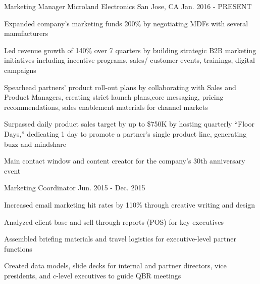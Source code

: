 

\begin{cventries}

  \cventry
    {Marketing Manager} %
    {Microland Electronics} %
    {San Jose, CA} %
    {Jan. 2016 - PRESENT} %
    {
      \begin{cvitems} %
               \item {Expanded company’s marketing funds 200\% by negotiating MDFs with several manufacturers}
       \item {Led revenue growth of 140\% over 7 quarters by building strategic B2B marketing initiatives including incentive programs, sales/ customer events, trainings, digital campaigns}
        \item {Spearhead partners’ product roll-out plans by collaborating with Sales and Product Managers, creating strict launch plans,core messaging, pricing recommendations, sales enablement materials for channel markets}
        \item {Surpassed daily product sales target by up to \$750K by hosting quarterly “Floor Days,” dedicating 1 day to promote a partner’s single product line, generating buzz and mindshare}
        \item {Main contact window and content creator for the company’s 30th anniversary event}
      \end{cvitems}
    }

  \cventry
    {Marketing Coordinator} %
    {} %
    {} %
    {Jun. 2015 - Dec. 2015} %
    {
      \begin{cvitems} %
        \item {Increased email marketing hit rates by 110\% through creative writing and design}
        \item {Analyzed client base and sell-through reports (POS) for key executives}
        \item {Assembled briefing materials and travel logistics for executive-level partner functions}
                \item {Created data models, slide decks for internal and partner directors, vice presidents, and c-level executives to guide QBR meetings}
      \end{cvitems}
    }

  
\end{cventries}
